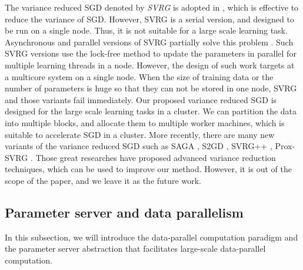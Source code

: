 \documentclass[preprint,review,11pt,a4paper]{elsarticle}
\begin{document}
The variance reduced SGD denoted by \emph{SVRG} is adopted in \cite{Johnson:9MAvkbgy}, which is  effective to reduce the variance of SGD. However, SVRG is a serial version, and designed to be run on a single node. Thus, it is not suitable for a large scale learning task. Asynchronous and parallel versions of SVRG partially solve this problem \cite{Zhao:SZfxEHHg, Reddi:2015vj, Mania:2015wa, lian2015asynchronous, Pan:2016wx}. Such SVRG versions use the lock-free method to update the parameters in parallel for multiple learning threads in a node. However, the design of such work targets at a multicore system on a single node. When the size of training data or the number of parameters  is huge so that they can not be stored in one node, SVRG and those variants fail immediately. Our proposed variance reduced SGD is designed for  the large scale learning tasks in a cluster. We can partition the data into multiple blocks, and allocate them to multiple worker machines, which is suitable to accelerate SGD in a cluster. More recently, there are many new variants of the variance reduced SGD such as SAGA \cite{Defazio:2014vu}, S2GD \cite{Richtarik:2013te}, SVRG++ \cite{Allen2015Improved}, Prox-SVRG \cite{Xiao:2014vw}. Those great researches have proposed advanced variance reduction techniques, which can be used to improve our method. However, it is out of the scope of the paper, and we leave it as the future work.








\subsection{Parameter server and data parallelism}
\label{parameter server}

In this subsection, we will introduce the data-parallel computation paradigm and the parameter server abstraction that facilitates large-scale data-parallel computation.
\end{document}
